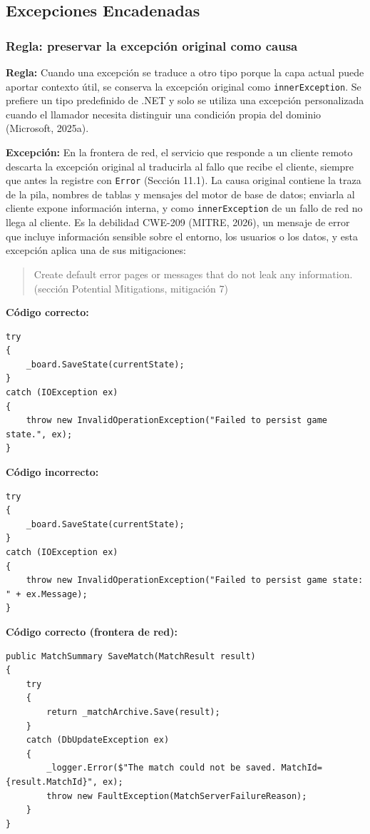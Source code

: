 \subsection{Excepciones Encadenadas}

\subsubsection{Regla: preservar la excepción original como causa}

\textbf{Regla:} Cuando una excepción se traduce a otro tipo porque la capa actual puede aportar contexto útil, se conserva la excepción original como \texttt{innerException}. Se prefiere un tipo predefinido de .NET y solo se utiliza una excepción personalizada cuando el llamador necesita distinguir una condición propia del dominio (Microsoft, 2025a).

\textbf{Excepción:} En la frontera de red, el servicio que responde a un cliente remoto descarta la excepción original al traducirla al fallo que recibe el cliente, siempre que antes la registre con \texttt{Error} (Sección 11.1). La causa original contiene la traza de la pila, nombres de tablas y mensajes del motor de base de datos; enviarla al cliente expone información interna, y como \texttt{innerException} de un fallo de red no llega al cliente. Es la debilidad CWE-209 (MITRE, 2026), un mensaje de error que incluye información sensible sobre el entorno, los usuarios o los datos, y esta excepción aplica una de sus mitigaciones:
\begin{quote}
Create default error pages or messages that do not leak any information. (sección Potential Mitigations, mitigación 7)
\end{quote}

\textbf{Código correcto:}
\begin{lstlisting}[style=csharpstyle]
try
{
    _board.SaveState(currentState);
}
catch (IOException ex)
{
    throw new InvalidOperationException("Failed to persist game state.", ex);
}
\end{lstlisting}

\textbf{Código incorrecto:}
\begin{lstlisting}[style=csharpstyle]
try
{
    _board.SaveState(currentState);
}
catch (IOException ex)
{
    throw new InvalidOperationException("Failed to persist game state: " + ex.Message);
}
\end{lstlisting}

\textbf{Código correcto (frontera de red):}
\begin{lstlisting}[style=csharpstyle]
public MatchSummary SaveMatch(MatchResult result)
{
    try
    {
        return _matchArchive.Save(result);
    }
    catch (DbUpdateException ex)
    {
        _logger.Error($"The match could not be saved. MatchId={result.MatchId}", ex);
        throw new FaultException(MatchServerFailureReason);
    }
}
\end{lstlisting}

